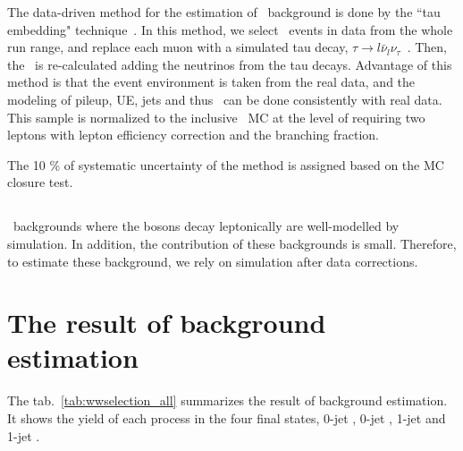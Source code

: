 The data-driven method for the estimation of \ztt\ background is done by the 
``tau embedding" technique~\cite{Chatrchyan:2014nva}. 
In this method, we select \dymm\ events in data
from the whole run range, 
and replace each muon with a simulated tau decay, 
$\tau \rightarrow l\bar{\nu}_l\nu_\tau$~\cite{}. 
Then, the \met\ is re-calculated adding the neutrinos from the tau decays. 
Advantage of this method is that the event environment is taken from the real data, 
and the modeling of pileup, UE, jets and thus \met\ can be done consistently 
with real data. This sample is normalized to the inclusive \ztt\ MC 
at the level of requiring two leptons with lepton efficiency correction
and the branching fraction.

The 10 \% of systematic uncertainty of the method is assigned based on the MC closure test. 

\subsection{\vv} 

\vv\ backgrounds where the bosons decay leptonically are well-modelled by simulation.
In addition, the contribution of these backgrounds is small. Therefore, to estimate these 
background, we rely on simulation after data corrections.  



\section{ The result of background estimation }

The tab.~\ref{tab:wwselection_all} summarizes the result of background estimation. 
It shows the yield of each process in the four final states, 0-jet \SF, 0-jet \DF,  
1-jet \SF and 1-jet \DF.  

